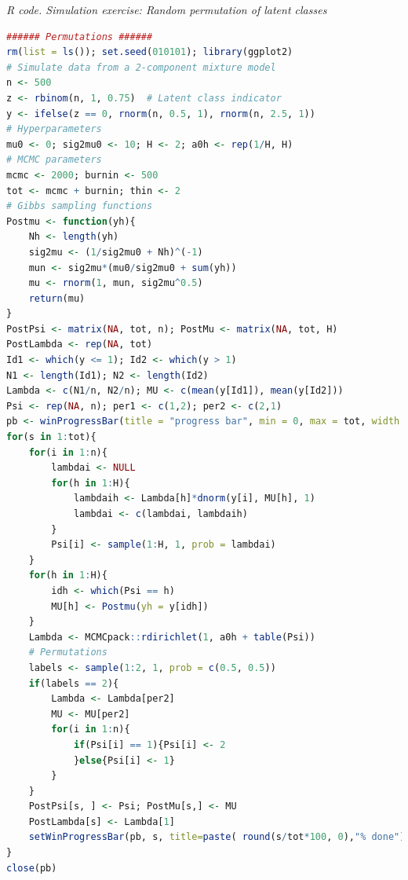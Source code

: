 \begin{tcolorbox}[enhanced,width=4.67in,center upper,
	fontupper=\large\bfseries,drop shadow southwest,sharp corners]
	\textit{R code. Simulation exercise: Random permutation of latent classes}
	\begin{VF}
		\begin{lstlisting}[language=R]
###### Permutations ######
rm(list = ls()); set.seed(010101); library(ggplot2)
# Simulate data from a 2-component mixture model
n <- 500
z <- rbinom(n, 1, 0.75)  # Latent class indicator
y <- ifelse(z == 0, rnorm(n, 0.5, 1), rnorm(n, 2.5, 1))
# Hyperparameters
mu0 <- 0; sig2mu0 <- 10; H <- 2; a0h <- rep(1/H, H)
# MCMC parameters
mcmc <- 2000; burnin <- 500
tot <- mcmc + burnin; thin <- 2
# Gibbs sampling functions
Postmu <- function(yh){
	Nh <- length(yh)
	sig2mu <- (1/sig2mu0 + Nh)^(-1)
	mun <- sig2mu*(mu0/sig2mu0 + sum(yh))
	mu <- rnorm(1, mun, sig2mu^0.5)
	return(mu)
}
PostPsi <- matrix(NA, tot, n); PostMu <- matrix(NA, tot, H)
PostLambda <- rep(NA, tot)
Id1 <- which(y <= 1); Id2 <- which(y > 1)
N1 <- length(Id1); N2 <- length(Id2)
Lambda <- c(N1/n, N2/n); MU <- c(mean(y[Id1]), mean(y[Id2]))
Psi <- rep(NA, n); per1 <- c(1,2); per2 <- c(2,1)
pb <- winProgressBar(title = "progress bar", min = 0, max = tot, width = 300)
for(s in 1:tot){
	for(i in 1:n){
		lambdai <- NULL
		for(h in 1:H){
			lambdaih <- Lambda[h]*dnorm(y[i], MU[h], 1)
			lambdai <- c(lambdai, lambdaih)
		}
		Psi[i] <- sample(1:H, 1, prob = lambdai)
	}
	for(h in 1:H){
		idh <- which(Psi == h)
		MU[h] <- Postmu(yh = y[idh])
	}
	Lambda <- MCMCpack::rdirichlet(1, a0h + table(Psi))
	# Permutations
	labels <- sample(1:2, 1, prob = c(0.5, 0.5))
	if(labels == 2){
		Lambda <- Lambda[per2]
		MU <- MU[per2]
		for(i in 1:n){
			if(Psi[i] == 1){Psi[i] <- 2
			}else{Psi[i] <- 1}
		}
	}
	PostPsi[s, ] <- Psi; PostMu[s,] <- MU
	PostLambda[s] <- Lambda[1]
	setWinProgressBar(pb, s, title=paste( round(s/tot*100, 0),"% done"))
}
close(pb)\end{lstlisting}
	\end{VF}
\end{tcolorbox}


